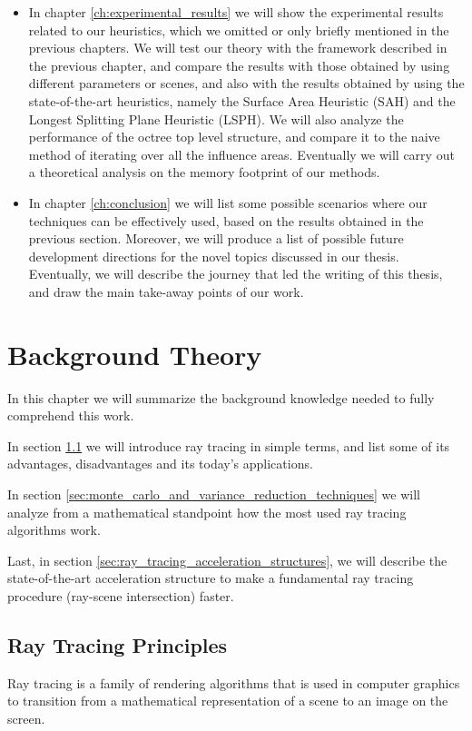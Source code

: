 \documentclass{PoliMi_MasterThesis}
\begin{document}
\begin{itemize}
	\item In chapter \ref{ch:experimental_results} we will show the experimental results related to our heuristics, which we omitted or only briefly mentioned in the previous chapters. We will test our theory with the framework described in the previous chapter, and compare the results with those obtained by using different parameters or scenes, and also with the results obtained by using the state-of-the-art heuristics, namely the Surface Area Heuristic (SAH) and the Longest Splitting Plane Heuristic (LSPH). We will also analyze the performance of the octree top level structure, and compare it to the naive method of iterating over all the influence areas. Eventually we will carry out a theoretical analysis on the memory footprint of our methods.
	\item In chapter \ref{ch:conclusion} we will list some possible scenarios where our techniques can be effectively used, based on the results obtained in the previous section. Moreover, we will produce a list of possible future development directions for the novel topics discussed in our thesis. Eventually, we will describe the journey that led the writing of this thesis, and draw the main take-away points of our work.
\end{itemize}


\chapter{Background Theory}
\label{ch:background_theory}
In this chapter we will summarize the background knowledge needed to fully comprehend this work.

In section \ref{sec:ray_tracing_principles} we will introduce ray tracing in simple terms, and list some of its advantages, disadvantages and its today's applications.

In section \ref{sec:monte_carlo_and_variance_reduction_techniques} we will analyze from a mathematical standpoint how the most used ray tracing algorithms work.

Last, in section \ref{sec:ray_tracing_acceleration_structures}, we will describe the state-of-the-art acceleration structure to make a fundamental ray tracing procedure (ray-scene intersection) faster.

\section{Ray Tracing Principles} \label{sec:ray_tracing_principles}
Ray tracing is a family of rendering algorithms that is used in computer graphics to transition from a mathematical representation of a scene to an image on the screen.
\end{document}
